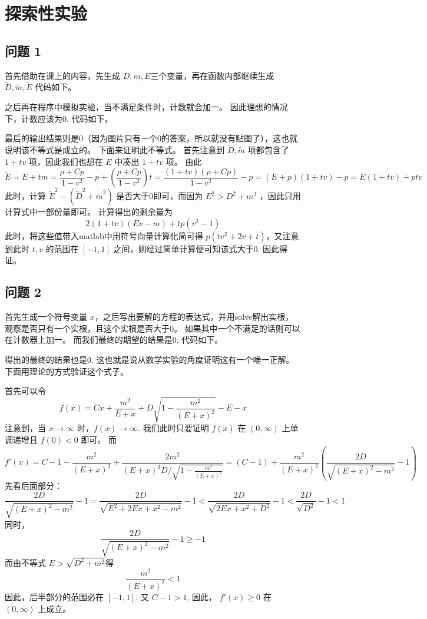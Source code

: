\documentclass[12pt]{ctexart}
\begin{document}
\section{探索性实验}

\subsection{问题 1}
首先借助在课上的内容，先生成 $D,m,E $三个变量，再在函数内部继续生成 $\tilde{D},\tilde{m}, \tilde{E}$
代码如下。



之后再在程序中模拟实验，当不满足条件时，计数就会加一。
因此理想的情况下，计数应该为0.
代码如下。



最后的输出结果则是0（因为图片只有一个0的答案，所以就没有贴图了），这也就说明该不等式是成立的。
下面来证明此不等式。
首先注意到 $\tilde{D},\tilde{m}$ 项都包含了 $1+tv$ 项，因此我们也想在 $E$ 中凑出 $1+tv$ 项。
由此
\[\tilde{E}=E+tm=\frac{\rho+C p}{1-v^{2}}-p+(\frac{\rho+C p}{1-v^{2}})t=\frac{(1+tv)(\rho+C p)}{1-v^{2}}-p
    =(E+p)(1+tv)-p=E(1+tv)+ptv\]
此时，计算 $\tilde{E}^2-(\tilde{D}^2+\tilde{m}^2)$ 是否大于0即可，而因为 $E^2>D^2+m^2$ ，因此只用计算式中一部份量即可。
计算得出的剩余量为
\[2(1+tv)(Ev-m)+tp(v^2-1)\]
此时，将这些值带入matlab中用符号向量计算化简可得 $p(tv^2+2v+t)$，又注意到此时 $t,v$ 的范围在 $[-1,1]$ 之间，则经过简单计算便可知该式大于0.
因此得证。

\subsection{问题 2}
首先生成一个符号变量 $x$，之后写出要解的方程的表达式，并用solve解出实根，观察是否只有一个实根，且这个实根是否大于0。
如果其中一个不满足的话则可以在计数器上加一。
而我们最终的期望的结果是0.
代码如下。



得出的最终的结果也是0.
这也就是说从数学实验的角度证明这有一个唯一正解。
下面用理论的方式验证这个式子。

首先可以令
\[f(x)=Cx+\frac{m^2}{E+x}+D\sqrt {1-\frac{m^2}{(E+x)^2}}-E-x\]
注意到，当 $x\rightarrow \infty$ 时，$f(x)\rightarrow\infty$.
我们此时只要证明 \(f(x)\) 在 \((0,\infty)\) 上单调递增且 \(f(0)<0\) 即可。
而
\[f'(x)=C-1-\frac{m^2}{(E+x)^2} +\frac{2m^2}{ (E+x)^3 D/\sqrt {1-\frac{m^2}{ (E+x)^2 }}}=
    (C-1)+\frac{m^2}{(E+x)^2}(\frac{2D}{\sqrt {(E+x)^2-m^2}}-1)\]
先看后面部分：
\[\frac{2D}{\sqrt {(E+x)^2-m^2}} -1=\frac{2D}{\sqrt {E^2+2Ex+x^2-m^2}}-1<
    \frac{2D}{\sqrt {2Ex+x^2+D^2}}-1<\frac{2D}{\sqrt {D^2}}-1<1\]
同时，
\[\frac{2D}{\sqrt {(E+x)^2-m^2}} -1 \geq -1\]
而由不等式 \(E>\sqrt {D^2+m^2}\)得
\[\frac{m^2}{(E+x)^2}<1\]
因此，后半部分的范围必在 $[-1,1]$.
又 $C-1>1$, 因此， $f'(x)\geq 0$ 在 $(0,\infty)$ 上成立。
\end{document}
